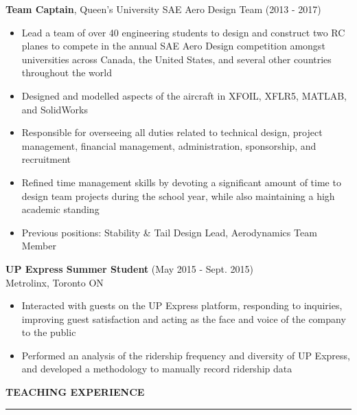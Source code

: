 \documentclass[11pt,letterpaper]{article}
\begin{document}

\textbf{Team Captain}, Queen's University SAE Aero Design Team \hfill (2013 - 2017)
\vspace{-0.2cm}
\begin{itemize}
	\item Lead a team of over 40 engineering students to design and construct two RC planes to compete in the annual SAE Aero Design competition amongst universities across Canada, the United States, and several other countries throughout the world
	\vspace{-0.25cm}
	\item Designed and modelled aspects of the aircraft in XFOIL,  XFLR5, MATLAB, and SolidWorks
	\vspace{-0.75cm}
	\item Responsible for overseeing all duties related to technical design, project management, financial management, administration, sponsorship, and recruitment
	\vspace{-0.25cm}
	\item 	 Refined time management skills by devoting a significant amount of time to design team projects during the school year, while also maintaining a high academic standing
	\vspace{-0.25cm}
	\item Previous positions: Stability \& Tail Design Lead, Aerodynamics Team Member
\end{itemize}


\textbf{UP Express Summer Student} \hfill (May 2015 - Sept. 2015) \\
Metrolinx, Toronto ON
\vspace{-0.2cm}
\begin{itemize}
	\item Interacted with guests on the UP Express platform, responding to inquiries, improving guest satisfaction and acting as the face and voice of the company to the public
	\vspace{-0.25cm}
	\item Performed an analysis of the ridership frequency and diversity of UP Express, and developed a methodology to manually record ridership data
\end{itemize}





{\large\textbf{TEACHING EXPERIENCE}}
\vspace{0.1cm}
\hrule
\vspace{0.3cm}
\end{document}
